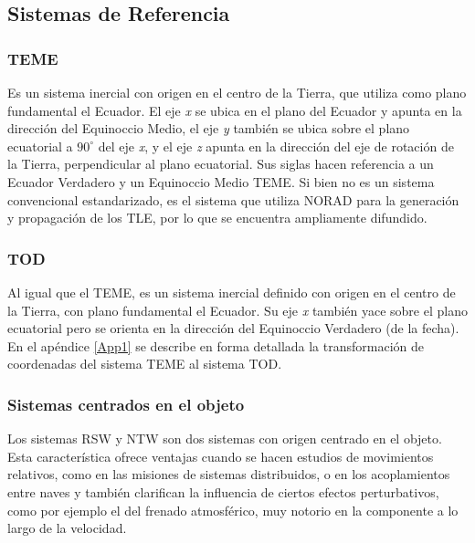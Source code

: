 \subsection{Sistemas de Referencia}\label{subsec:sistRef}

\subsubsection*{TEME}
 Es un sistema inercial con origen en el centro de la Tierra, que utiliza como plano fundamental el Ecuador. El eje {\it{x}} se ubica en el plano del Ecuador y apunta en la direcci\'on del Equinoccio Medio, el eje {\it{y}} tambi\'en se ubica sobre el plano ecuatorial a $90^{\circ}$ del eje {\it{x}}, y el eje {\it{z}} apunta en la direcci\'on del eje de rotaci\'on de la Tierra, perpendicular al plano ecuatorial. Sus siglas hacen referencia a un Ecuador Verdadero y un Equinoccio Medio \ac{TEME}. Si bien no es un sistema convencional estandarizado, es el sistema que utiliza NORAD para la generaci\'on y propagaci\'on de los TLE, por lo que se encuentra ampliamente difundido.
 
\subsubsection*{TOD}
 Al igual que el TEME, es un sistema inercial definido con origen en el centro de la Tierra, con plano fundamental el Ecuador. Su eje {\it{x}} tambi\'en yace sobre el plano ecuatorial pero se orienta en la direcci\'on del Equinoccio Verdadero (de la fecha).\\
 En el ap\'endice \ref{App1} se describe en forma detallada la transformaci\'on de coordenadas del sistema TEME al sistema TOD.
 
\subsubsection*{Sistemas centrados en el objeto}
Los sistemas RSW y NTW son dos sistemas con origen centrado en el objeto. Esta caracter\'istica ofrece ventajas cuando se hacen estudios de movimientos relativos, como en las misiones de sistemas distribuidos, o en los acoplamientos entre naves y tambi\'en clarifican la influencia de ciertos efectos perturbativos, como por ejemplo el del frenado atmosf\'erico, muy notorio en la componente a lo largo de la velocidad.\\

